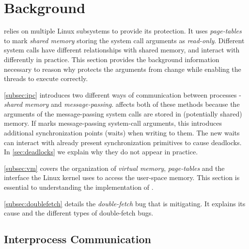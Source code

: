 \section{Background}
\label{sec:background}

\sysname relies on multiple Linux subsystems to provide its protection. It uses
\emph{page-tables} to mark \emph{shared memory} storing the system call
arguments as \emph{read-only}. Different system calls have different
relationships with shared memory, and interact with \sysname differently in
practice. This section provides the background information necessary to reason
why \sysname protects the arguments from change while enabling the threads to
execute correctly.

\autoref{subsec:ipc} introduces two different ways of communication between
processes - \emph{shared memory} and \emph{message-passing}. \sysname affects
both of these methods because the arguments of the message-passing system calls
are stored in (potentially shared) memory. If \sysname marks message-passing
system-call arguments, this introduces additional synchronization points (waits)
when writing to them. The new waits can interact with already present
synchronization primitives to cause deadlocks. In \autoref{sec:deadlocks} we
explain why they do not appear in practice.

\autoref{subsec:vm} covers the organization of \emph{virtual memory},
\emph{page-tables} and the interface the Linux kernel uses to access the
user-space memory. This section is essential to understanding the implementation
of \sysname.

\autoref{subsec:doublefetch} details the \emph{double-fetch} bug that \sysname
is mitigating. It explains its cause and the different types of double-fetch bugs.


\subsection{Interprocess Communication}
\label{subsec:ipc}

